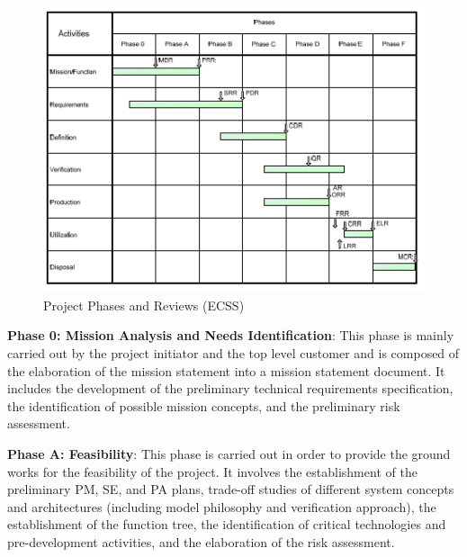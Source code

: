 \begin{figure}[h]
\centering\includegraphics[scale=1.0]{fig/project_phases_and_reviews}
\caption{Project Phases and Reviews (ECSS)}
\label{fig:Project Phases and Reviews}
\end{figure}

\textbf{Phase 0: Mission Analysis and Needs Identification}: This phase is mainly carried out by the project initiator and the top level customer and is composed of the elaboration of the mission statement into a mission statement document. It includes the development of the preliminary technical requirements specification, the identification of possible mission concepts, and the preliminary risk assessment. 

\textbf{Phase A: Feasibility}: This phase is carried out in order to provide the ground works for the feasibility of the project. It involves the establishment of the preliminary PM, SE, and PA plans, trade-off studies of different system concepts and architectures (including model philosophy and verification approach), the establishment of the function tree, the identification of critical technologies and pre-development activities, and the elaboration of the risk assessment.

